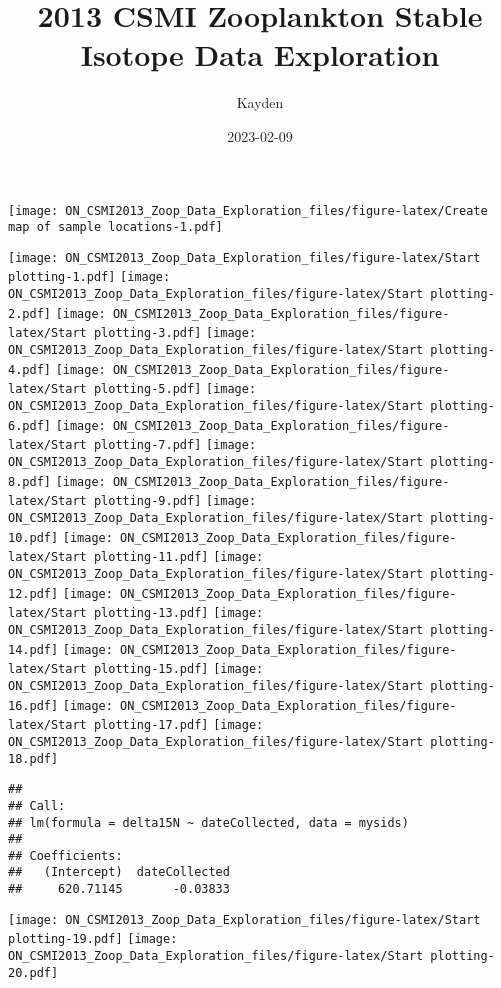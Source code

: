 \documentclass[
]{article}
\title{2013 CSMI Zooplankton Stable Isotope Data Exploration}
\author{Kayden}
\date{2023-02-09}
\begin{document}
\maketitle

\texttt{[image: ON\_CSMI2013\_Zoop\_Data\_Exploration\_files/figure-latex/Create map of sample locations-1.pdf]}

\texttt{[image: ON\_CSMI2013\_Zoop\_Data\_Exploration\_files/figure-latex/Start plotting-1.pdf]}
\texttt{[image: ON\_CSMI2013\_Zoop\_Data\_Exploration\_files/figure-latex/Start plotting-2.pdf]}
\texttt{[image: ON\_CSMI2013\_Zoop\_Data\_Exploration\_files/figure-latex/Start plotting-3.pdf]}
\texttt{[image: ON\_CSMI2013\_Zoop\_Data\_Exploration\_files/figure-latex/Start plotting-4.pdf]}
\texttt{[image: ON\_CSMI2013\_Zoop\_Data\_Exploration\_files/figure-latex/Start plotting-5.pdf]}
\texttt{[image: ON\_CSMI2013\_Zoop\_Data\_Exploration\_files/figure-latex/Start plotting-6.pdf]}
\texttt{[image: ON\_CSMI2013\_Zoop\_Data\_Exploration\_files/figure-latex/Start plotting-7.pdf]}
\texttt{[image: ON\_CSMI2013\_Zoop\_Data\_Exploration\_files/figure-latex/Start plotting-8.pdf]}
\texttt{[image: ON\_CSMI2013\_Zoop\_Data\_Exploration\_files/figure-latex/Start plotting-9.pdf]}
\texttt{[image: ON\_CSMI2013\_Zoop\_Data\_Exploration\_files/figure-latex/Start plotting-10.pdf]}
\texttt{[image: ON\_CSMI2013\_Zoop\_Data\_Exploration\_files/figure-latex/Start plotting-11.pdf]}
\texttt{[image: ON\_CSMI2013\_Zoop\_Data\_Exploration\_files/figure-latex/Start plotting-12.pdf]}
\texttt{[image: ON\_CSMI2013\_Zoop\_Data\_Exploration\_files/figure-latex/Start plotting-13.pdf]}
\texttt{[image: ON\_CSMI2013\_Zoop\_Data\_Exploration\_files/figure-latex/Start plotting-14.pdf]}
\texttt{[image: ON\_CSMI2013\_Zoop\_Data\_Exploration\_files/figure-latex/Start plotting-15.pdf]}
\texttt{[image: ON\_CSMI2013\_Zoop\_Data\_Exploration\_files/figure-latex/Start plotting-16.pdf]}
\texttt{[image: ON\_CSMI2013\_Zoop\_Data\_Exploration\_files/figure-latex/Start plotting-17.pdf]}
\texttt{[image: ON\_CSMI2013\_Zoop\_Data\_Exploration\_files/figure-latex/Start plotting-18.pdf]}

\begin{verbatim}
## 
## Call:
## lm(formula = delta15N ~ dateCollected, data = mysids)
## 
## Coefficients:
##   (Intercept)  dateCollected  
##     620.71145       -0.03833
\end{verbatim}

\texttt{[image: ON\_CSMI2013\_Zoop\_Data\_Exploration\_files/figure-latex/Start plotting-19.pdf]}
\texttt{[image: ON\_CSMI2013\_Zoop\_Data\_Exploration\_files/figure-latex/Start plotting-20.pdf]}
\end{document}
